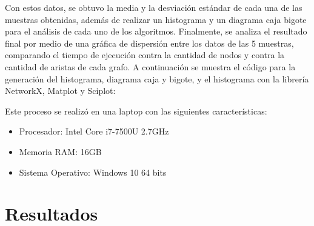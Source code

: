 \documentclass{article}
\begin{document}
Con estos datos, se obtuvo la media y la desviación estándar de cada una de las muestras obtenidas, además de realizar un histograma y un diagrama caja bigote para el análisis de cada uno de los algoritmos. Finalmente, se analiza el resultado final por medio de una gráfica de dispersión entre los datos de las 5 muestras, comparando el tiempo de ejecución contra la cantidad de nodos y contra la cantidad de aristas de cada grafo.
A continuación se muestra el código para la generación del histograma, diagrama caja y bigote, y el histograma con la librería NetworkX, Matplot y Sciplot:




Este proceso se realizó en una laptop con las siguientes características:
\begin{itemize}
\item{Procesador}: Intel Core i7-7500U 2.7GHz
\item{Memoria RAM}: 16GB 
\item{Sistema Operativo}: Windows 10 64 bits
\end{itemize}
\section{Resultados}
\end{document}
